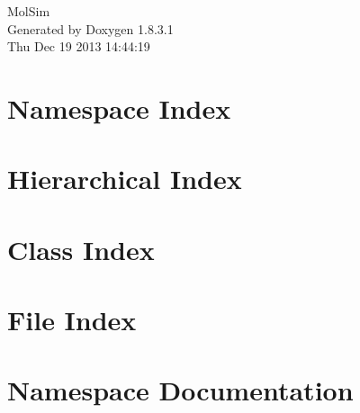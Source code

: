 \documentclass{book}
\begin{document}
\hypersetup{pageanchor=false,citecolor=blue}
\begin{titlepage}
\vspace*{7cm}
\begin{center}
{\Large Mol\-Sim }\\
\vspace*{1cm}
{\large Generated by Doxygen 1.8.3.1}\\
\vspace*{0.5cm}
{\small Thu Dec 19 2013 14:44:19}\\
\end{center}
\end{titlepage}
\clearemptydoublepage
{}
\tableofcontents
\clearemptydoublepage
{}
\hypersetup{pageanchor=true,citecolor=blue}
\chapter{Namespace Index}

\chapter{Hierarchical Index}

\chapter{Class Index}

\chapter{File Index}

\chapter{Namespace Documentation}




\end{document}
